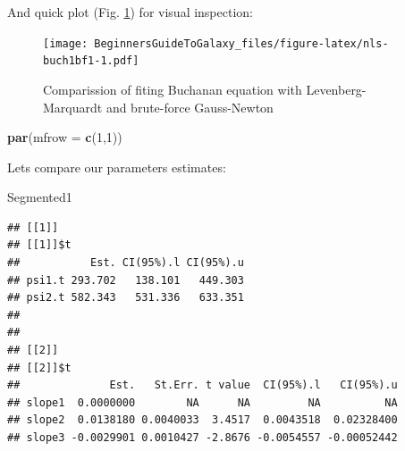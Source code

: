 \documentclass[]{book}
\newenvironment{Shaded}{\begin{snugshade}}{\end{snugshade}}
\newcommand{\KeywordTok}[1]{\textcolor[rgb]{0.13,0.29,0.53}{\textbf{#1}}}
\newcommand{\DataTypeTok}[1]{\textcolor[rgb]{0.13,0.29,0.53}{#1}}
\newcommand{\DecValTok}[1]{\textcolor[rgb]{0.00,0.00,0.81}{#1}}
\newcommand{\OperatorTok}[1]{\textcolor[rgb]{0.81,0.36,0.00}{\textbf{#1}}}
\newcommand{\NormalTok}[1]{#1}
\theoremstyle{definition}
\theoremstyle{definition}
\theoremstyle{definition}
\theoremstyle{remark}
\begin{document}
And quick plot (Fig. \ref{fig:nls-buch1bf1}) for visual inspection:

\begin{Shaded}
\end{Shaded}

\begin{figure}
\centering
\texttt{[image: BeginnersGuideToGalaxy\_files/figure-latex/nls-buch1bf1-1.pdf]}
\caption{\label{fig:nls-buch1bf1}Comparission of fiting Buchanan equation
with Levenberg-Marquardt and brute-force Gauss-Newton}
\end{figure}

\begin{Shaded}
\begin{Highlighting}[]
\KeywordTok{par}\NormalTok{(}\DataTypeTok{mfrow =} \KeywordTok{c}\NormalTok{(}\DecValTok{1}\NormalTok{,}\DecValTok{1}\NormalTok{))}
\end{Highlighting}
\end{Shaded}

Lets compare our parameters estimates:

\begin{Shaded}
\begin{Highlighting}[]
\NormalTok{Segmented1}
\end{Highlighting}
\end{Shaded}

\begin{verbatim}
## [[1]]
## [[1]]$t
##           Est. CI(95%).l CI(95%).u
## psi1.t 293.702   138.101   449.303
## psi2.t 582.343   531.336   633.351
## 
## 
## [[2]]
## [[2]]$t
##              Est.   St.Err. t value  CI(95%).l   CI(95%).u
## slope1  0.0000000        NA      NA         NA          NA
## slope2  0.0138180 0.0040033  3.4517  0.0043518  0.02328400
## slope3 -0.0029901 0.0010427 -2.8676 -0.0054557 -0.00052442
\end{verbatim}
\end{document}

